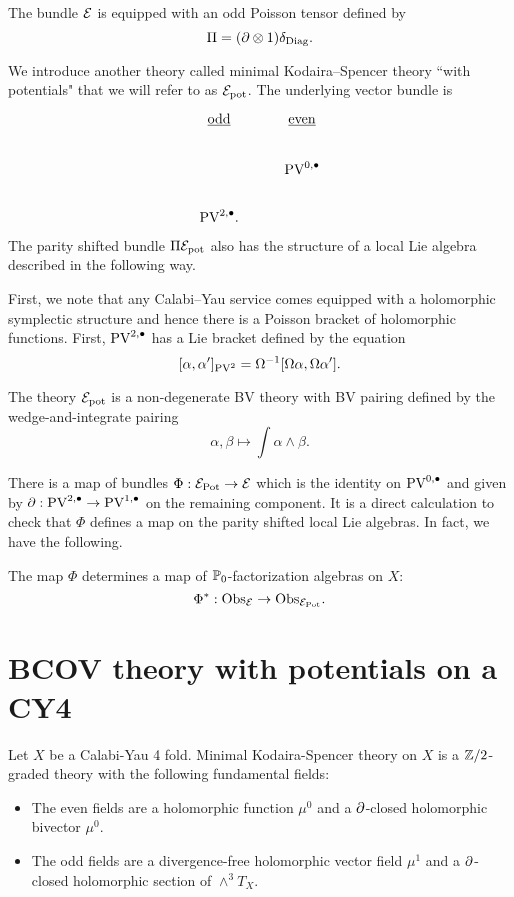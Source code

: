 \documentclass[11pt]{article}
\newcommand\bu{\bullet}
\begin{document}
The bundle $\mathcal{E}$ is equipped with an odd Poisson tensor defined by 
\[
\Pi = (\partial \otimes 1) \delta_{\rm Diag} .
\]

We introduce another theory called minimal Kodaira--Spencer theory ``with potentials" that we will refer to as $\mathcal{E}_{\rm pot}$. 
The underlying vector bundle is 
\[
\begin{tikzcd}
\ul{\rm odd} & \ul{\rm even} \\
 & \PV^{0,\bu} \\
 \PV^{2,\bu}  .
\end{tikzcd}
\]
The parity shifted bundle $\Pi \mathcal{E}_{\rm pot}$ also has the structure of a local Lie algebra described in the following way. 

First, we note that any Calabi--Yau service comes equipped with a holomorphic symplectic structure and hence there is a Poisson bracket of holomorphic functions. 
First, $\PV^{2, \bu}$ has a Lie bracket defined by the equation
\[
[\alpha, \alpha']_{\text{PV}^2} = \Omega^{-1} [\Omega \alpha, \Omega \alpha'] .
\]

The theory $\mathcal{E}_{\rm pot}$ is a non-degenerate BV theory with BV pairing defined by the wedge-and-integrate pairing
\[
\alpha, \beta \mapsto \int \alpha \wedge \beta  .
\]

There is a map of bundles $\Phi : \mathcal{E}_{\rm Pot} \to \mathcal{E}$ which is the identity on $\PV^{0,\bu}$ and given by $\partial : \PV^{2,\bu} \to \PV^{1,\bu}$ on the remaining component. 
It is a direct calculation to check that $\Phi$ defines a map on the parity shifted local Lie algebras.
In fact, we have the following.

\begin{prop}
The map $\Phi$ determines a map of $\mathbb{P}_0$-factorization algebras on $X$:
\[
\Phi^* : {\rm Obs}_{\mathcal{E}} \to {\rm Obs}_{\mathcal{E}_{\rm Pot}} .
\]
\end{prop}

\section{BCOV theory with potentials on a CY4}
\label{sec:org3d6a090}
Let \(X\) be a Calabi-Yau 4 fold. Minimal Kodaira-Spencer theory on $X$ is a $\mathbb{Z}/2$-graded theory with the following fundamental fields:
\begin{itemize}
\item The even fields are a holomorphic function $\mu^0$ and a $\partial$-closed holomorphic bivector $\mu^0$.
\item The odd fields are a divergence-free holomorphic vector field $\mu^1$ and a $\partial$-closed holomorphic section of $\wedge^3 T_X$. 
\end{itemize}
\end{document}
